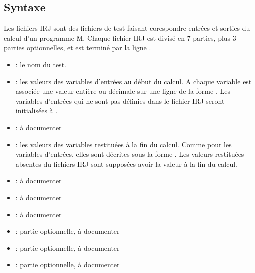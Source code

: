 \documentclass[letterpaper,10pt,french]{sphinxmanual}
\begin{document}
\subsection{Syntaxe}
\label{\detokenize{syntax_irj:syntaxe}}
\sphinxAtStartPar
Les fichiers IRJ sont des fichiers de test faisant corespondre entrées et
sorties du calcul d’un programme M.
Chaque fichier IRJ est divisé en 7 parties, plus 3 parties optionnelles,
et est terminé par la ligne \sphinxcode{\sphinxupquote{\#\#}}.
\begin{itemize}
\item {} 
\sphinxAtStartPar
{} : le nom du test.

\item {} 
\sphinxAtStartPar
{} : les valeurs des variables d’entrées au début du calcul. A chaque variable  est associée une valeur  entière ou décimale sur une ligne de la forme . Les variables d’entrées qui ne sont pas définies dans le fichier IRJ seront initialisées à .

\item {} 
\sphinxAtStartPar
{} : à documenter

\item {} 
\sphinxAtStartPar
{} : les valeurs des variables restituées à la fin du calcul. Comme pour les variables d’entrées, elles sont décrites sous la forme . Les valeurs restituées absentes du fichiers IRJ sont supposées avoir la valeur  à la fin du calcul.

\item {} 
\sphinxAtStartPar
{} : à documenter

\item {} 
\sphinxAtStartPar
{} : à documenter

\item {} 
\sphinxAtStartPar
{} : à documenter

\item {} 
\sphinxAtStartPar
{} : partie optionnelle, à documenter

\item {} 
\sphinxAtStartPar
{} : partie optionnelle, à documenter

\item {} 
\sphinxAtStartPar
{} : partie optionnelle, à documenter

\end{itemize}
\end{document}
